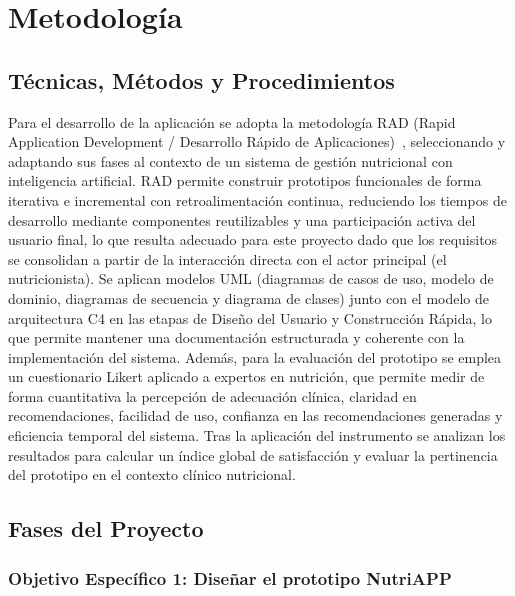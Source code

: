 \clearpage
\section{Metodología}

\subsection{Técnicas, Métodos y Procedimientos}

Para el desarrollo de la aplicación se adopta la metodología RAD (Rapid Application Development / Desarrollo Rápido de Aplicaciones)~\cite{fauzi2023}, seleccionando y adaptando sus fases al contexto de un sistema de gestión nutricional con inteligencia artificial. RAD permite construir prototipos funcionales de forma iterativa e incremental con retroalimentación continua, reduciendo los tiempos de desarrollo mediante componentes
reutilizables y una participación activa del usuario final, lo que resulta adecuado para este proyecto dado que los requisitos se consolidan a partir de la interacción directa con el actor principal (el nutricionista). Se aplican modelos UML (diagramas de casos de uso, modelo de dominio, diagramas de secuencia y diagrama de clases) junto con el modelo de arquitectura C4 en las etapas de Diseño del Usuario y Construcción Rápida, lo que permite mantener una documentación estructurada y coherente con la implementación del sistema. Además, para la evaluación del prototipo se emplea un cuestionario Likert aplicado a expertos en nutrición, que permite medir de forma cuantitativa la percepción de
adecuación clínica, claridad en recomendaciones, facilidad de uso, confianza en las recomendaciones generadas y eficiencia temporal del sistema. Tras la aplicación del instrumento se analizan los resultados para calcular un índice global de satisfacción y evaluar la pertinencia del prototipo en el contexto clínico nutricional.

\subsection{Fases del Proyecto}

\subsubsection*{Objetivo Específico 1: Diseñar el prototipo NutriAPP}

